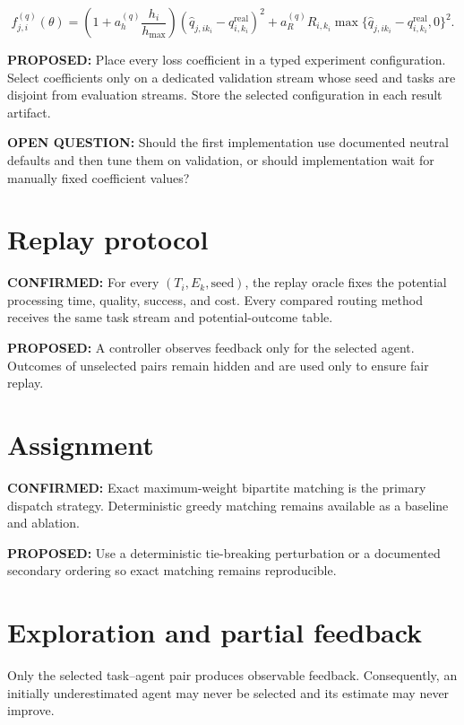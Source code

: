 \documentclass[11pt]{article}
\newcommand{\Confirmed}[1]{\par\noindent\textcolor{confirmed}{\textbf{CONFIRMED:} #1}\par}
\newcommand{\Proposal}[1]{\par\noindent\textcolor{proposal}{\textbf{PROPOSED:} #1}\par}
\newcommand{\Question}[1]{\par\noindent\textcolor{question}{\textbf{OPEN QUESTION:} #1}\par}
\begin{document}
\begin{equation}
f_{j,i}^{(q)}(\theta)=
\left(1+a_h^{(q)}\frac{h_i}{h_{\max}}\right)
(\widehat q_{j,ik_i}-q_{i,k_i}^{\mathrm{real}})^2+
a_R^{(q)}R_{i,k_i}
\max\{\widehat q_{j,ik_i}-q_{i,k_i}^{\mathrm{real}},0\}^2.
\end{equation}

\Proposal{Place every loss coefficient in a typed experiment configuration.
Select coefficients only on a dedicated validation stream whose seed and tasks
are disjoint from evaluation streams. Store the selected configuration in each
result artifact.}

\Question{Should the first implementation use documented neutral defaults and
then tune them on validation, or should implementation wait for manually fixed
coefficient values?}

\section{Replay protocol}

\Confirmed{For every $(T_i,E_k,\mathrm{seed})$, the replay oracle fixes the
potential processing time, quality, success, and cost. Every compared routing
method receives the same task stream and potential-outcome table.}

\Proposal{A controller observes feedback only for the selected agent. Outcomes
of unselected pairs remain hidden and are used only to ensure fair replay.}

\section{Assignment}

\Confirmed{Exact maximum-weight bipartite matching is the primary dispatch
strategy. Deterministic greedy matching remains available as a baseline and
ablation.}

\Proposal{Use a deterministic tie-breaking perturbation or a documented
secondary ordering so exact matching remains reproducible.}

\section{Exploration and partial feedback}

Only the selected task--agent pair produces observable feedback. Consequently,
an initially underestimated agent may never be selected and its estimate may
never improve.
\end{document}

